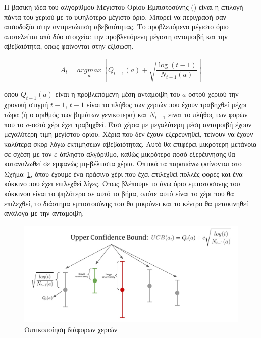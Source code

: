 Η βασική ιδέα του αλγορίθμου Μέγιστου Ορίου Εμπιστοσύνης () είναι η επιλογή πάντα του χεριού με το υψηλότερο μέγιστο όριο. Μπορεί να περιγραφή σαν αισιοδοξία στην αντιμετώπιση αβεβαιότητας. Το προβλεπόμενο μέγιστο όριο αποτελείται από δύο στοιχεία: την προβλεπόμενη μέγιστη ανταμοιβή και την αβεβαιότητα, όπως φαίνονται στην εξίσωση.

\begin{equation}
    A_t = \underset{a}{argmax}\;\left[Q_{t-1}(a) + \sqrt{\frac{\log{(t-1)}}{N_{t-1}(a)}}\right]
\end{equation}

όπου $Q_{t-1}(a)$ είναι η προβλεπόμενη μέση ανταμοιβή του $a$-οστού χεριού την χρονική στιγμή $t-1$, $t-1$ είναι το πλήθος των χεριών που έχουν τραβηχθεί μέχρι τώρα (ή ο αριθμός των βημάτων γενικότερα) και $N_{t-1}$ είναι το πλήθος των φορών που το $a$-οστό χέρι έχει τραβηχθεί. Έτσι χέρια με μεγαλύτερη μέση ανταμοιβή έχουν μεγαλύτερη τιμή μεγίστου ορίου. Χέρια που δεν έχουν εξερευνηθεί, τείνουν να έχουν καλύτερα σκορ λόγω εκτιμήσεων αβεβαιότητας. Αυτό θα επιφέρει μικρότερη μετάνοια σε σχέση με τον $ε$-άπληστο αλγόριθμο, καθώς μικρότερο ποσό εξερέυνησης θα καταναλωθεί σε εμφανώς μη-βέλτιστα χέρια. Οπτικά τα παραπάνω φαίνονται στο Σχήμα~\ref{fig:ucb}, όπου έχουμε ένα πράσινο χέρι που έχει επιλεχθεί πολλές φορές και ένα κόκκινο που έχει επιλεχθεί λίγες. Όπως βλέπουμε το άνω όριο εμπιστοσυνης του κόκκινου είναι το ψηλότερο σε αυτό το βήμα, οπότε αυτό είναι το χέρι που θα επιλεχθεί, το διάστημα εμπιστοσύνης του θα μικρύνει και το κέντρο θα μετακινηθεί ανάλογα με την ανταμοιβή.

\begin{figure}
    \centering
    \includegraphics[width=\textwidth]{body_matter/bandits/images/ucb.jpg}
    \caption{Οπτικοποίηση  \cite{yan2022bandit} διάφορων χεριών}
    \label{fig:ucb}
\end{figure}

